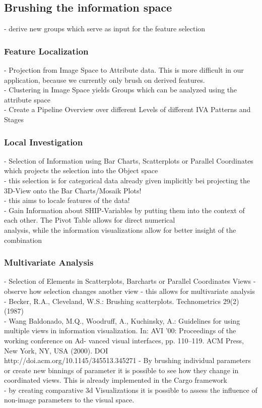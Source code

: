 \documentclass[journal]{style/vgtc}           %
\begin{document}
\subsection{Brushing the information space} 
- derive new groups which serve as input for the feature selection

\subsubsection{Feature Localization}
- Projection from Image Space to Attribute data. This is more difficult in our application, because we currently only brush on derived features.\\
- Clustering in Image Space yields Groups which can be analyzed using the attribute space\\
- Create a Pipeline Overview over different Levels of different IVA Patterns and Stages

\subsubsection{Local Investigation}
- Selection of Information using Bar Charts, Scatterplots or Parallel Coordinates which projects the selection into the Object space\\
- this selection is for categorical data already given implicitly bei projecting the 3D-View onto the Bar Charts/Mosaik Plots!\\
- this aims to locale features of the data!\\
- Gain Information about SHIP-Variables by putting them into the context of each other. The Pivot Table allows for direct numerical\\ analysis, while the information visualizations allow for better insight of the combination

\subsubsection{Multivariate Analysis}
- Selection of Elements in Scatterplots, Barcharts or Parallel Coordinates Views - observe how selection changes another view - this allows for multivariate analysis\\
- Becker, R.A., Cleveland, W.S.: Brushing scatterplots. Technometrics 29(2) (1987)\\
- Wang Baldonado, M.Q., Woodruff, A., Kuchinsky, A.: Guidelines for using multiple views in information visualization. In: AVI ’00: Proceedings of the working conference on Ad- vanced visual interfaces, pp. 110–119. ACM Press, New York, NY, USA (2000). DOI\\ http://doi.acm.org/10.1145/345513.345271
- By brushing individual parameters or create new binnings of parameter it is possible to see how they change in coordinated views. This is already implemented in the Cargo framework\\
- by creating comparative 3d Visualizations it is possible to assess the influence of non-image parameters to the visual space.
\end{document}
